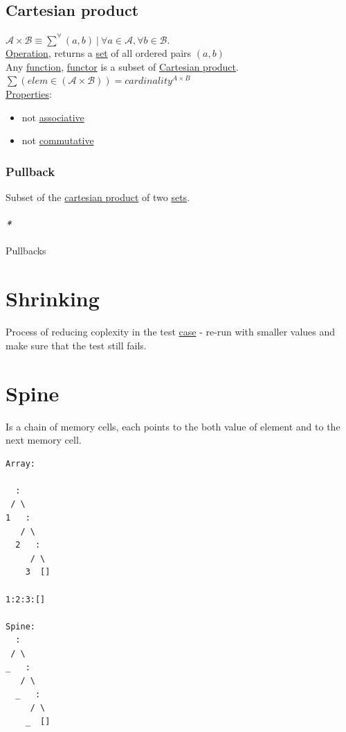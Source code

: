 \documentclass[a4paper,14pt,oneside]{book}
\begin{document}
\section{\label{org883e440}Cartesian product}
\label{sec:orgd566cdf}
\(\mathcal{A} \times \mathcal{B} \equiv \sum^{\forall}{(a,b)} \ | \ \forall a \in \mathcal{A}, \forall b \in \mathcal{B}\).\\
\hyperref[org894d189]{Operation}, returns a \hyperref[org0f7f8fa]{set} of all ordered pairs \((a, b)\)\\

Any \hyperref[orge00b05b]{function}, \hyperref[orgf855504]{functor} is a subset of \hyperref[org883e440]{Cartesian product}.\\

\(\sum{(elem \in (\mathcal{A} \times \mathcal{B}))}  = cardinality^{A \times B}\)\\

\hyperref[orgbcfea7d]{Properties}:\\
\begin{itemize}
\item not \hyperref[org5fe1690]{associative}\\
\item not \hyperref[org48aa4ae]{commutative}\\
\end{itemize}

\subsection{\label{orga65fd2f}Pullback}
\label{sec:orgfe1f297}
Subset of the \hyperref[org883e440]{cartesian product} of two \hyperref[org72aaee3]{sets}.\\

\subsubsection{\emph{*}}
\label{sec:org901e263}
\label{orgbb07216}Pullbacks\\

\chapter{\label{orgba88c1c}Shrinking}
\label{sec:org5104e35}
Process of reducing coplexity in the test \hyperref[orgbaad414]{case} - re-run with smaller values and make sure that the test still fails.\\

\chapter{\label{org589bbf2}Spine}
\label{sec:org5f42b86}
Is a chain of memory cells, each points to the both value of element and to the next memory cell.\\
\begin{verbatim}
Array:

  :
 / \
1   :
   / \
  2   :
     / \
    3  []

1:2:3:[]

Spine:
  :
 / \
_   :
   / \
  _   :
     / \
    _  []

\end{verbatim}
\end{document}
